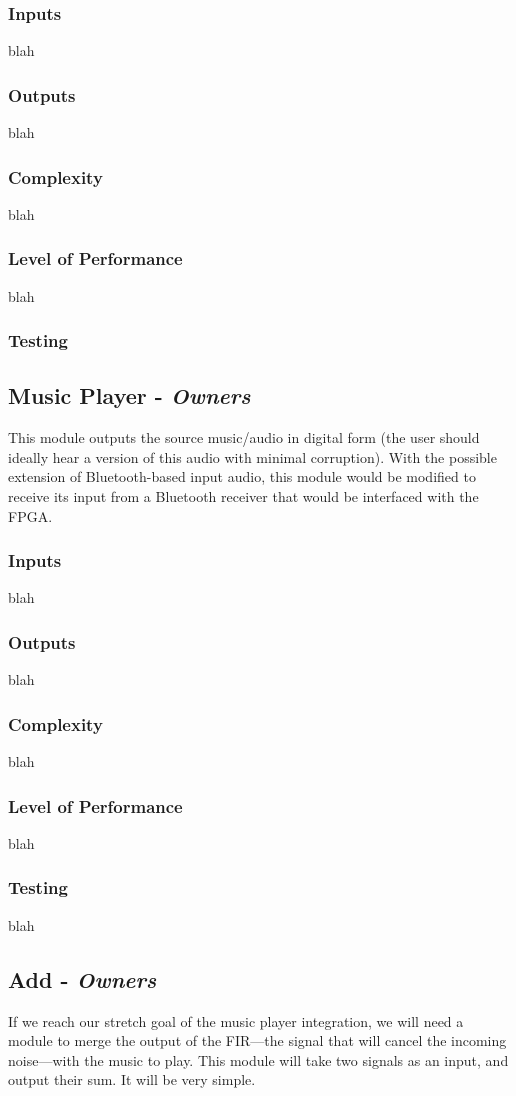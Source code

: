 \documentclass[12pt]{fpgairpods}
\begin{document}
\begin{multicols}{2}
\subsubsection{Inputs}
blah
\subsubsection{Outputs}
blah
\subsubsection{Complexity}
blah
\subsubsection{Level of Performance}
blah
\subsubsection{Testing}

\subsection{Music Player - \textit{Owners}}
This module outputs the source music/audio in digital form (the user should ideally hear a version of this audio with minimal corruption). With the possible extension of Bluetooth-based input audio, this module would be modified to receive its input from a Bluetooth receiver that would be interfaced with the FPGA.
\subsubsection{Inputs}
blah
\subsubsection{Outputs}
blah
\subsubsection{Complexity}
blah
\subsubsection{Level of Performance}
blah
\subsubsection{Testing}
blah

\subsection{Add - \textit{Owners}}
If we reach our stretch goal of the music player integration, we will need a module to merge the output of the FIR---the signal that will cancel the incoming noise---with the music to play. This module will take two signals as an input, and output their sum. It will be very simple.

\end{multicols}
\end{document}
